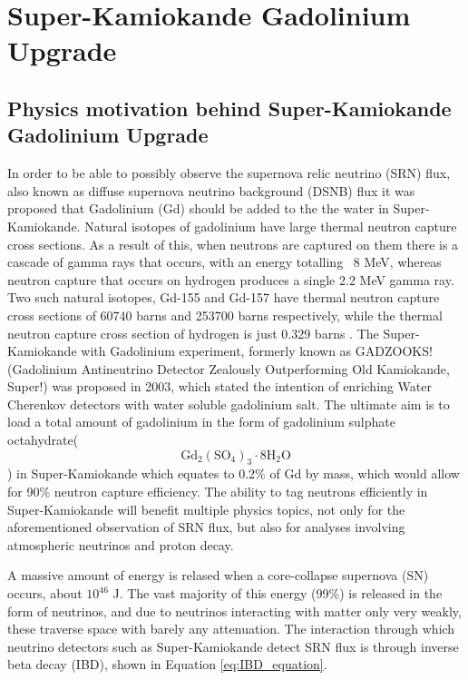 \chapter{Super-Kamiokande Gadolinium Upgrade}\label{chp:superkgdupgrade}


\section{Physics motivation behind Super-Kamiokande Gadolinium Upgrade}

In order to be able to possibly observe the supernova relic neutrino (SRN) flux, also known as diffuse supernova neutrino background (DSNB) flux it was proposed that Gadolinium (Gd) should be added to the the water in Super-Kamiokande. Natural isotopes of gadolinium have large thermal neutron capture cross sections. As a result of this, when neutrons are captured on them there is a cascade of gamma rays that occurs, with an energy totalling ~8 MeV, whereas neutron capture that occurs on hydrogen produces a single 2.2 MeV gamma ray. Two such natural isotopes, Gd-155 and Gd-157 have thermal neutron capture cross sections of 60740 barns and 253700 barns respectively, while the thermal neutron capture cross section of hydrogen is just 0.329 barns \cite{meoMeasurementNeutronCapture}. The Super-Kamiokande with Gadolinium experiment, formerly known as GADZOOKS! (Gadolinium Antineutrino Detector Zealously Outperforming Old Kamiokande, Super!) was proposed in 2003, which stated the intention of enriching Water Cherenkov detectors with water soluble gadolinium salt. The ultimate aim is to load a total amount of gadolinium in the form of gadolinium sulphate octahydrate($$
\mathrm{Gd}_{2}\left(\mathrm{SO}_{4}\right)_{3} \cdot 8 \mathrm{H}_{2} \mathrm{O}$$) in Super-Kamiokande which equates to 0.2\% of Gd by mass, which would allow for 90\% neutron capture efficiency. The ability to tag neutrons efficiently in Super-Kamiokande will benefit multiple physics topics, not only for the aforementioned observation of SRN flux, but also for analyses involving atmospheric neutrinos and proton decay. 
\newline

A massive amount of energy is relased when a core-collapse supernova (SN) occurs, about $10^{46}$ J. The vast majority of this energy (99\%) is released in the form of neutrinos, and due to neutrinos interacting with matter only very weakly, these traverse space with barely any attenuation. The interaction through which neutrino detectors such as Super-Kamiokande detect SRN flux is through inverse beta decay (IBD), shown in Equation \ref{eq:IBD_equation}. 

